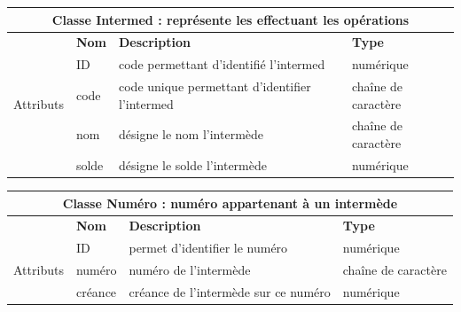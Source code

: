 		\begin{center}
			{\renewcommand{\arraystretch}{1.5}\begin{tabularx}{\textwidth}{|l|l|l|X|}
					\hline
					\multicolumn{4}{|c|}{\textbf{Classe Intermed : représente les effectuant les opérations}} \\
					
					\hline
					
					& \textbf{Nom} & \textbf{Description} & \textbf{Type} \\
					\multirow{3}{*}{Attributs} & ID & code permettant d'identifié l'intermed & numérique \\
					
					& code & code unique permettant d'identifier l'intermed &  chaîne de caractère \\
					
					& nom & désigne le nom l'intermède & chaîne de caractère \\
					
					& solde & désigne le solde l'intermède & numérique \\
					\hline
			\end{tabularx}}
			\label{classe intermède}
		\end{center}
	
		\begin{center}
			{\renewcommand{\arraystretch}{1.5}\begin{tabularx}{\textwidth}{|l|l|l|X|}
					\hline
					\multicolumn{4}{|c|}{\textbf{Classe Numéro : numéro appartenant à un intermède}} \\
					
					\hline
					
					& \textbf{Nom} & \textbf{Description} & \textbf{Type} \\
					\multirow{3}{*}{Attributs} & ID & permet d'identifier le numéro & numérique \\
					
					& numéro & numéro de l'intermède & chaîne de caractère \\
					
					& créance & créance de l'intermède sur ce numéro  & numérique \\
					
					\hline
			\end{tabularx}}
			\label{classe numero}
		\end{center}
		
